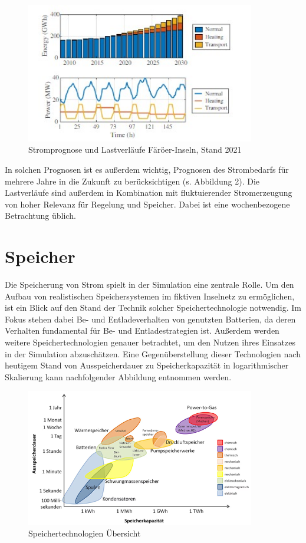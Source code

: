 \begin{figure}[h!]
    \centering
    \includegraphics[width=10cm]{Abbildungen/StandDerTechnikAbb2.jpg}
    \caption{Stromprognose und Lastverläufe Färöer-Inseln, Stand 2021}\label{fig:Stromprognose_und_Lastverläufe}
\end{figure}

In solchen Prognosen ist es außerdem wichtig, Prognosen des Strombedarfs für mehrere Jahre in die Zukunft zu berücksichtigen (s. Abbildung 2). 
Die Lastverläufe sind außerdem in Kombination mit fluktuierender Stromerzeugung von hoher Relevanz für Regelung und Speicher. 
Dabei ist eine wochenbezogene Betrachtung üblich.

\section{Speicher}

Die Speicherung von Strom spielt in der Simulation eine zentrale Rolle. 
Um den Aufbau von realistischen Speichersystemen im fiktiven Inselnetz zu ermöglichen, 
ist ein Blick auf den Stand der Technik solcher Speichertechnologie notwendig. 
Im Fokus stehen dabei Be- und Entladeverhalten von genutzten Batterien, da deren Verhalten fundamental für Be- und Entladestrategien ist. 
Außerdem werden weitere Speichertechnologien genauer betrachtet, um den Nutzen ihres Einsatzes in der Simulation abzuschätzen. 
Eine Gegenüberstellung dieser Technologien nach heutigem Stand von Ausspeicherdauer zu Speicherkapazität in 
logarithmischer Skalierung kann nachfolgender Abbildung entnommen werden.

\begin{figure}[h!]
    \centering
    \includegraphics[width=10cm]{Abbildungen/StandDerTechnikAbb3.png}
    \caption{Speichertechnologien Übersicht}\label{fig:Speichertechnologien_Übersicht}
\end{figure}
 
